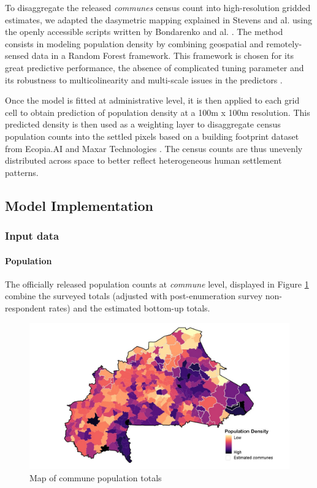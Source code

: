 \documentclass[]{book}
\let\oldparagraph\paragraph
\renewcommand{\paragraph}[1]{\oldparagraph{#1}\mbox{}}
\begin{document}
To disaggregate the released \emph{communes} census count into
high-resolution gridded estimates, we adapted the dasymetric mapping
explained in Stevens and al. \citeyearpar{stevens2015disaggregating}
using the openly accessible scripts written by Bondarenko and al.
\citeyearpar{bondarenko2018wpgprfpms}. The method consists in modeling
population density by combining geospatial and remotely-sensed data in a
Random Forest framework. This framework is chosen for its great
predictive performance, the absence of complicated tuning parameter and
its robustness to multicolinearity and multi-scale issues in the
predictors \citep{robnik2004improving}.

Once the model is fitted at administrative level, it is then applied to
each grid cell to obtain prediction of population density at a 100m x
100m resolution. This predicted density is then used as a weighting
layer to disaggregate census population counts into the settled pixels
based on a building footprint dataset from Ecopia.AI and Maxar
Technologies \citeyearpar{ecopia.ai2019}. The census counts are thus
unevenly distributed across space to better reflect heterogeneous human
settlement patterns.

\subsection{Model Implementation}\label{model-implementation-1}

\subsubsection{Input data}\label{input-data-2}

\paragraph{Population}\label{population-1}

The officially released population counts at \emph{commune} level,
displayed in Figure \ref{fig:map-pop} combine the surveyed totals
(adjusted with post-enumeration survey non-respondent rates) and the
estimated bottom-up totals.

\begin{figure}

{\centering \includegraphics[width=0.9\linewidth]{dat/BFAv1/map_admin3} 

}

\caption{Map of commune population totals}\label{fig:map-pop}
\end{figure}
\end{document}
